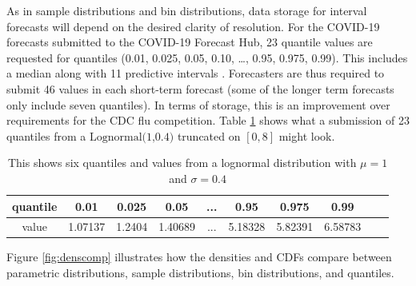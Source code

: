 \documentclass[11pt,notitlepage]{isuthesis}
\begin{document}
As in sample distributions and bin distributions, 
data storage for interval forecasts will
depend on the desired clarity of resolution. For the COVID-19 forecasts 
submitted to the COVID-19 Forecast Hub, 23 quantile values are requested for 
quantiles (0.01, 0.025, 0.05, 0.10, …, 0.95, 0.975, 0.99). This includes a 
median along with 11 predictive intervals \cite[]{bracher2021evaluating}. 
Forecasters are thus required to submit 46 values in each short-term forecast 
(some of the longer term forecasts only include seven quantiles). In terms of 
storage, this is an improvement over requirements for the CDC flu competition. 
Table
\ref{table:qstor} shows what a submission of 23 quantiles from a 
$\mbox{Lognormal(1,0.4)}$ truncated on $[0,8]$ might look.



\begin{table}[h!]
\centering
\begin{center}

\captionsetup{font=scriptsize}

 \begin{tabular}{|c||c|c|c|c|c|c|c|c|c|}
 \hline
    quantile & 0.01 & 0.025 & 0.05  & ...  & 0.95 & 0.975 & 0.99 \\ \hline
    value & 1.07137 & 1.2404 & 1.40689 & ... & 5.18328 &
    5.82391 & 6.58783 \\
    
 \hline
 \end{tabular}
 \begin{minipage}{10cm}
 \caption[Quantile storage]{This shows six quantiles
 and values from a lognormal distribution with $\mu = 1$ and $\sigma = 0.4$}
 \label{table:qstor}
 \end{minipage}
 \end{center}
\end{table}

Figure \ref{fig:denscomp} illustrates how the densities and CDFs compare 
between parametric distributions, sample distributions, bin distributions, and
quantiles. 
\end{document}
